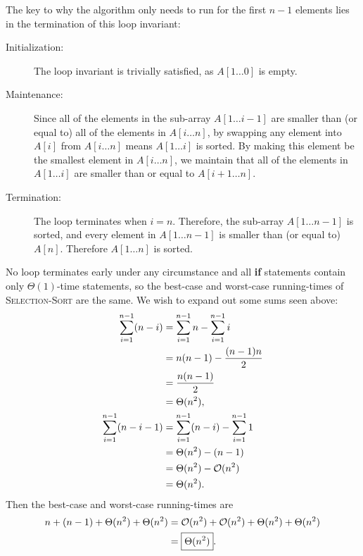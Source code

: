 \documentclass[Chapter02]{subfiles}
\begin{document}
\begin{enumerate}[leftmargin=\labelsep]
\begin{answer}
			The key to why the algorithm only needs to run for the first $n - 1$ elements lies in the termination of this loop invariant:
			\begin{description}
				\item[Initialization:] The loop invariant is trivially satisfied, as $A[1 \dots 0]$ is empty.

				\item[Maintenance:] Since all of the elements in the sub-array $A[1 \dots i - 1]$ are smaller than (or equal to) all of the elements in $A[i \dots n]$, by swapping any element into $A[i]$ from $A[i \dots n]$ means $A[1 \dots i]$ is sorted. By making this element be the smallest element in $A[i \dots n]$, we maintain that all of the elements in $A[1 \dots i]$ are smaller than or equal to $A[i + 1 \dots n]$.

				\item[Termination:] The loop terminates when $i = n$. Therefore, the sub-array $A[1 \dots n - 1]$ is sorted, and every element in $A[1 \dots n - 1]$ is smaller than (or equal to) $A[n]$. Therefore $A[1 \dots n]$ is sorted.
			\end{description}

			No loop terminates early under any circumstance and all \textbf{if} statements contain only $\Theta(1)$-time statements, so the best-case and worst-case running-times of \textsc{Selection-Sort} are the same. We wish to expand out some sums seen above:
			\begin{align*}
				\sum_{i = 1}^{n - 1} (n - i) &= \sum_{i = 1}^{n - 1} n - \sum_{i = 1}^{n - 1} i\\
					&= n(n - 1) - \frac{(n-1)n}{2}\\
					&= \frac{n(n-1)}{2}\\
					&= \Theta(n^2),\\
				\sum_{i = 1}^{n - 1} (n - i - 1) &= \sum_{i = 1}^{n - 1} (n - i) - \sum_{i = 1}^{n - 1} 1\\
				    &= \Theta(n^2) - (n - 1)\\
				    &= \Theta(n^2) - \mathcal{O}(n^2)\\
				    &= \Theta(n^2).
			\end{align*}
			Then the best-case and worst-case running-times are
			\begin{align*}
				n + (n - 1) + \Theta(n^2) + \Theta(n^2) &= \mathcal{O}(n^2) + \mathcal{O}(n^2) + \Theta(n^2) + \Theta(n^2)\\
					&= \boxed{\Theta(n^2)}.
			\end{align*}
		\end{answer}


\end{enumerate}
\end{document}
